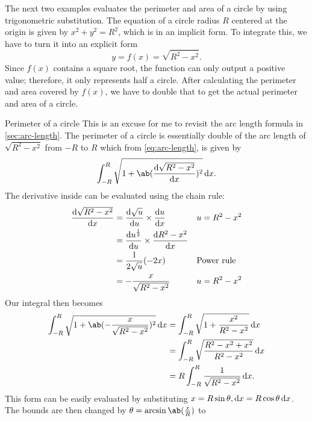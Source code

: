 The next two examples evaluates the perimeter and area of a circle by using trigonometric substitution. The equation of a circle radius \(R\) centered at the origin is given by \(x^2 + y^2 = R^2\), which is in an implicit form. To integrate this, we have to turn it into an explicit form
\begin{equation}
  y = f(x) = \sqrt{R^2 - x^2}.
\end{equation}
Since \(f(x)\) contains a square root, the function can only output a positive value; therefore, it only represents half a circle. After calculating the perimeter and area covered by \(f(x)\), we have to double that to get the actual perimeter and area of a circle.

\begin{exmp}{Perimeter of a circle}{}
  This is an excuse for me to revisit the arc length formula in \cref{sec:arc-length}. The perimeter of a circle is essentially double of the arc length of \(\sqrt{R^2 - x^2}\) from \(-R\) to \(R\) which from \cref{eq:arc-length}, is given by
  \begin{equation}
    \int_{-R}^{R}\sqrt{1 + \ab(\odv{\sqrt{R^2 - x^2}}{x})^2}\odif{x}.
  \end{equation}
  The derivative inside can be evaluated using the chain rule:
  \begin{align}
    \odv{\sqrt{R^2 - x^2}}{x} & = \odv{\sqrt{u}}{u} \times \odv{u}{x}                &  & u = R^2 - x^2       \\
                              & = \odv{u^{\frac{1}{2}}}{u} \times \odv{R^2 - x^2}{x}                          \\
                              & = \frac{1}{2\sqrt{u}}(-2x)                           &  & \textrm{Power rule} \\
                              & = -\frac{x}{\sqrt{R^2 - x^2}}                        &  & u = R^2 - x^2
  \end{align}
  Our integral then becomes
  \begin{align}
    \int_{-R}^{R}\sqrt{1 + \ab(-\frac{x}{\sqrt{R^2 - x^2}})^2}\odif{x}
     & = \int_{-R}^{R}\sqrt{1 + \frac{x^2}{R^2 - x^2}}\odif{x}         \\
     & = \int_{-R}^{R}\sqrt{\frac{R^2 - x^2 + x^2}{R^2 - x^2}}\odif{x} \\
     & = R\int_{-R}^{R}\frac{1}{\sqrt{R^2 - x^2}}\odif{x}.
  \end{align}
  This form can be easily evaluated by substituting \(x = R\sin\theta, \odif{x} = R\cos\theta\odif{x}\). The bounds are then changed by \(\theta = \arcsin\ab(\frac{x}{R})\) to

\end{exmp}
